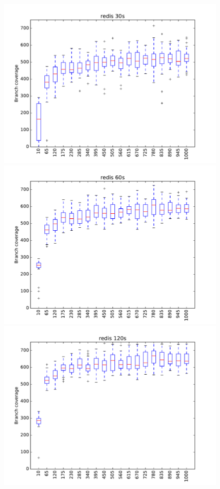 \begin{figure}
\includegraphics[width=\columnwidth]{graphs/redisrand30}
\includegraphics[width=\columnwidth]{graphs/redisrand60}
\includegraphics[width=\columnwidth]{graphs/redisrand120}
\end{figure}

